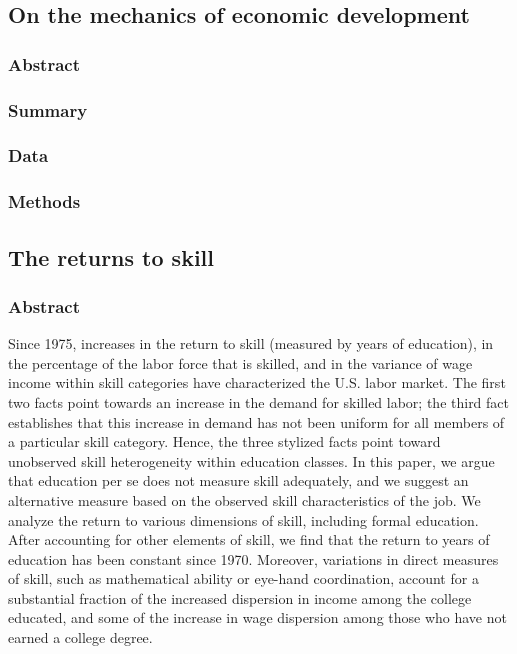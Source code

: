 \documentclass[12pt]{article}
\begin{document}

\subsection*{On the mechanics of economic development\cite{on_the_mechanics}}

\subsubsection*{Abstract}

\subsubsection*{Summary}

\subsubsection*{Data}

\subsubsection*{Methods}


\subsection*{The returns to skill}

\subsubsection*{Abstract}
Since 1975, increases in the return to skill (measured by years of education), in the percentage of the labor force that is skilled, and in the variance of wage income within skill categories have characterized the U.S. labor market. The first two facts point towards an increase in the demand for skilled labor; the third fact establishes that this increase in demand has not been uniform for all members of a particular skill category. Hence, the three stylized facts point toward unobserved skill heterogeneity within education classes. In this paper, we argue that education per se does not measure skill adequately, and we suggest an alternative measure based on the observed skill characteristics of the job. We analyze the return to various dimensions of skill, including formal education. After accounting for other elements of skill, we find that the return to years of education has been constant since 1970. Moreover, variations in direct measures of skill, such as mathematical ability or eye-hand coordination, account for a substantial fraction of the increased dispersion in income among the college educated, and some of the increase in wage dispersion among those who have not earned a college degree.
\end{document}
